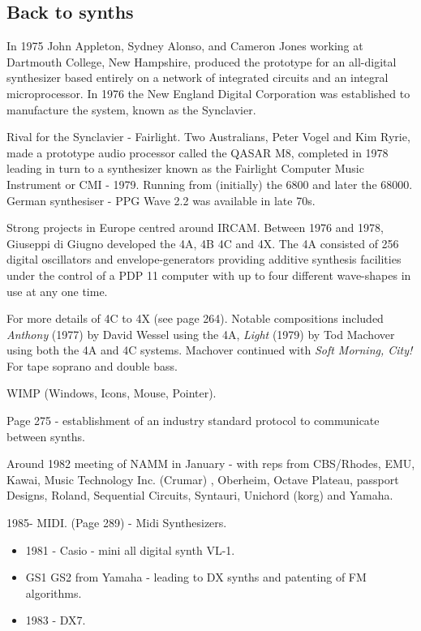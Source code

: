 \subsection{Back to synths}

In 1975 John Appleton, Sydney Alonso, and Cameron Jones working at Dartmouth College, New Hampshire, produced the prototype for an all-digital synthesizer based entirely on a network of integrated circuits and an integral microprocessor.  In 1976 the New England Digital Corporation was established to manufacture the system, known as the Synclavier.


Rival for the Synclavier - Fairlight.
Two Australians, Peter Vogel and Kim Ryrie, made a prototype audio processor called the QASAR M8, completed in 1978 leading in turn to a synthesizer known as the Fairlight Computer Music Instrument or CMI - 1979.  Running from (initially) the 6800 and later the 68000.
German synthesiser - PPG Wave 2.2 was available in late 70s.

Strong projects in Europe centred around IRCAM.
Between 1976 and 1978, Giuseppi di Giugno developed the 4A, 4B 4C and 4X. The 4A consisted of 256 digital oscillators and envelope-generators providing additive synthesis facilities under the control of a PDP 11 computer with up to four different wave-shapes in use at any one time. 

For more details of 4C to 4X (see page 264).  Notable compositions included \textit{Anthony} (1977) by David Wessel using the 4A, \textit{Light} (1979) by Tod Machover using both the 4A and 4C systems.  Machover continued with \textit{Soft Morning, City!}  For tape soprano and double bass. 

WIMP (Windows, Icons, Mouse, Pointer).

Page 275 - establishment of an industry standard protocol to communicate between synths.

Around 1982 meeting of NAMM in January - with reps from CBS/Rhodes, EMU, Kawai, Music Technology Inc. (Crumar) , Oberheim, Octave Plateau, passport Designs, Roland,  Sequential Circuits, Syntauri, Unichord (korg) and Yamaha.

1985- MIDI. (Page 289) - Midi Synthesizers.

\begin{itemize}
\item 1981 - Casio - mini all digital synth VL-1.
\item GS1 GS2 from Yamaha - leading to DX synths and patenting of FM algorithms.
\item 1983 - DX7.
\end{itemize}

